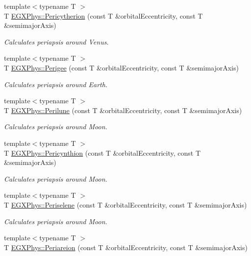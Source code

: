 \begin{DoxyCompactItemize}
{\footnotesize template$<$typename T $>$ }\\T \hyperlink{group___astrophysics_gaa270e364cbbd7d3d6212872df484926f}{E\+G\+X\+Phys\+::\+Pericytherion} (const T \&orbital\+Eccentricity, const T \&semimajor\+Axis)
\begin{DoxyCompactList}\small\item\em Calculates periapsis around Venus. \end{DoxyCompactList}\item 
{\footnotesize template$<$typename T $>$ }\\T \hyperlink{group___astrophysics_gae2d053caf69cb0b4c3207064a2ab143a}{E\+G\+X\+Phys\+::\+Perigee} (const T \&orbital\+Eccentricity, const T \&semimajor\+Axis)
\begin{DoxyCompactList}\small\item\em Calculates periapsis around Earth. \end{DoxyCompactList}\item 
{\footnotesize template$<$typename T $>$ }\\T \hyperlink{group___astrophysics_ga2cc7ab05e18d32c94d8d74972e032793}{E\+G\+X\+Phys\+::\+Perilune} (const T \&orbital\+Eccentricity, const T \&semimajor\+Axis)
\begin{DoxyCompactList}\small\item\em Calculates periapsis around Moon. \end{DoxyCompactList}\item 
{\footnotesize template$<$typename T $>$ }\\T \hyperlink{group___astrophysics_gaeeba153b188cd06cbd233eaef12f0a6a}{E\+G\+X\+Phys\+::\+Pericynthion} (const T \&orbital\+Eccentricity, const T \&semimajor\+Axis)
\begin{DoxyCompactList}\small\item\em Calculates periapsis around Moon. \end{DoxyCompactList}\item 
{\footnotesize template$<$typename T $>$ }\\T \hyperlink{group___astrophysics_ga255874374dde571531e443cdbef9ef0c}{E\+G\+X\+Phys\+::\+Periselene} (const T \&orbital\+Eccentricity, const T \&semimajor\+Axis)
\begin{DoxyCompactList}\small\item\em Calculates periapsis around Moon. \end{DoxyCompactList}\item 
{\footnotesize template$<$typename T $>$ }\\T \hyperlink{group___astrophysics_ga0617ba07a30b0fd0544c02f691bfae26}{E\+G\+X\+Phys\+::\+Periareion} (const T \&orbital\+Eccentricity, const T \&semimajor\+Axis)

\end{DoxyCompactItemize}
